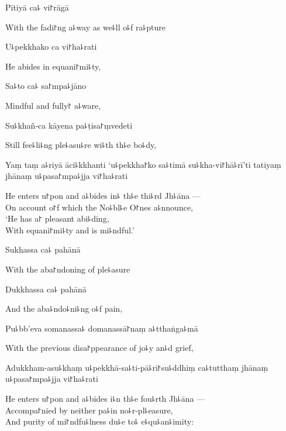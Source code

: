 Pītiyā ca꜕ vi꜓rāgā

\begin{english}
  With the fadi꜓ng a꜕way as we꜕ll o꜕f ra꜕pture
\end{english}

U꜕pekkhako ca vi꜓ha꜕rati

\begin{english}
  He abides in equani꜓mi꜕ty,
\end{english}

Sa꜕to ca꜕ sa꜓mpa꜕jāno

\begin{english}
  Mindful and fully꜓ a꜕ware,
\end{english}

Su꜕khañ-ca kāyena pa꜕ṭisa꜓ṃvedeti

\begin{english}
  Still fee꜕li꜕ng ple꜕asu꜕re wi꜕th th꜕e bo꜕dy,
\end{english}

Yaṃ taṃ a꜕riyā āci꜕kkhanti `u꜕pekkha꜓ko sa꜕timā su꜕kha-vi꜓hā꜕rī'ti tatiyaṃ jhānaṃ u꜕pasa꜓mpa꜕jja vi꜓ha꜕rati

\begin{english}
  He enters u꜓pon and a꜕bides in꜕ th꜕e thi꜕rd Jh꜕āna ---\\
  On account o꜓f which the No꜕bl꜕e O꜓nes a꜕nnounce,\\
  `He has a꜓ pleasant abi꜕ding,\\
  With equani꜓mi꜕ty and is mi꜕ndful.'
\end{english}

Sukhassa ca꜕ pahānā

\begin{english}
  With the aba꜓ndoning of ple꜕asure
\end{english}

Dukkhassa ca꜕ pahānā

\begin{english}
  And the aba꜕ndo꜕ni꜕ng o꜕f pain,
\end{english}

Pu꜕bb'eva somanassa꜕ domanassā꜓naṃ a꜕tthaṅga꜕mā

\begin{english}
  With the previous disa꜓ppearance of jo꜕y an꜕d grief,
\end{english}

Adukkham-asu꜕khaṃ u꜕pekkhā-sa꜕ti-pā꜕ri꜓su꜕ddhiṃ ca꜕tutthaṃ jhānaṃ u꜕pasa꜓mpa꜕jja vi꜓ha꜕rati

\begin{english}
  He enters u꜓pon and a꜕bides i꜕n th꜕e fou꜕rth Jh꜕āna ---\\
  Accompa꜓nied by neither pa꜕in no꜕r-pl꜕easure,\\
  And purity of mi꜓ndfu꜕lness du꜕e to꜕ e꜕qu꜕an꜕imity:
\end{english}


